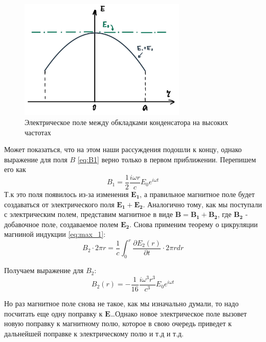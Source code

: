 \begin{figure}
    \centering
    \includegraphics[width=8cm]{images/plot1.jpg}
    \caption{Электрическое поле между обкладками конденсатора на высоких частотах}
\end{figure}

\indent
Может показаться, что на этом наши рассуждения подошли к концу, однако выражение для поля $B$ \ref{eq:B1} верно только в первом приближении. Перепишем его как 
$$B_1 = \frac{1}{2}\frac{i\omega r}{c} E_0 e^{i\omega t}$$
Т.к это поля появилось из-за изменения $\mathbf{E_1}$, а правильное магнитное поле будет создаваться от электрического поля $\mathbf{E_1} + \mathbf{E_2}$. Аналогично тому, как мы поступали с электрическим полем, представим магнитное в виде $\mathbf{B} = \mathbf{B_1} + \mathbf{B_2}$, где $\mathbf{B_2}$ - добавочное поле, создаваемое полем $\mathbf{E_2}$. Снова применим теорему о цикруляции магниной индукции \ref{eq:max_1}:
$$B_2 \cdot 2 \pi r = \frac{1}{c} \int_{0}^{r} \frac{\partial E_2(r)}{\partial t} \cdot 2\pi rdr$$

Получаем выражение для $B_2$:
\begin{equation}
    B_2(r) = -\frac{1}{16}\frac{i\omega^3 r^3}{c^3}E_0 e^{i\omega t}
\end{equation}

\indent
Но раз магнитное поле снова не такое, как мы изначально думали, то надо посчитать еще одну поправку к $\mathbf{E}$\dots Однако новое электрическое поле вызовет новую поправку к магнитному полю, которое в свою очередь приведет к дальнейшей поправке к электрическому полю и т.д и т.д.

